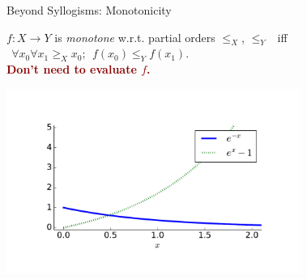 \begin{frame}{Beyond Syllogisms: Monotonicity}
\begin{center}
  $f : X \rightarrow Y$ is \textit{monotone} w.r.t. partial orders 
    $\leq_X$, $\leq_Y~~$ 
    iff
    $~~\forall x_0 \forall x_1 \geq_X x_0; ~~ f(x_0) \leq_Y f(x_1)$. \\
  \vspace{1ex}
  \textcolor<1>{white}{\textcolor<2->{darkred}{\textbf{Don't need to evaluate $f$.}}}
\end{center}
\begin{center}
  \includegraphics[height=6cm]{../img/monotonicity_math.pdf}
\end{center}
\end{frame}




